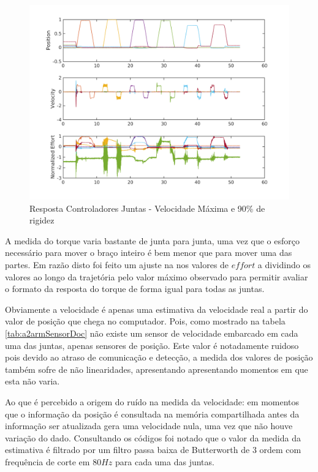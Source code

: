 \vspace{1cm}
\begin{figure}[H]
    \centering
    \includegraphics[width = \linewidth]{tex/figs/jointIdentificationFullSpeed_stiff90p.png}
    \caption{Resposta Controladores Juntas - Velocidade Máxima e 90\% de rigidez}
    \label{fig:jointIdentificationFullSpeed_stiff90p}
\end{figure}

A medida do torque varia bastante de junta para junta, uma vez que o esforço necessário para mover o braço inteiro é bem menor que para mover uma das partes. Em razão disto foi feito um ajuste na nos valores de $effort$ a dividindo os valores ao longo da trajetória pelo valor máximo observado para permitir avaliar o formato da resposta do torque de forma igual para todas as juntas.

Obviamente a velocidade é apenas uma estimativa da velocidade real a partir do valor de posição que chega no computador. Pois, como mostrado na tabela \ref{tab:a2armSensorDoc} não existe um sensor de velocidade embarcado em cada uma das juntas, apenas sensores de posição. Este valor é notadamente ruidoso pois devido ao atraso de comunicação e detecção, a medida dos valores de posição também sofre de não linearidades, apresentando apresentando momentos em que esta não varia.

Ao que é percebido a origem do ruído na medida da velocidade: em momentos que o informação da posição é consultada na memória compartilhada antes da informação ser atualizada gera uma velocidade nula, uma vez que não houve variação do dado. Consultando os códigos foi notado que o valor da medida da estimativa é filtrado por um filtro passa baixa de Butterworth de 3 ordem com frequência de corte em $80 Hz$ para cada uma das juntas.

